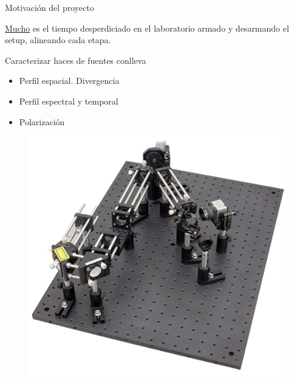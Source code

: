 \begin{frame}[t,plain]
\titlepage
\end{frame}



\begin{frame}[t]{Motivación del proyecto}


\begin{center}
\underline{Mucho} es el tiempo desperdiciado en el laboratorio armado y desarmando el setup, alineando cada etapa.
\end{center}

\begin{minipage}{0.5\textwidth}
Caracterizar haces de fuentes conlleva
\begin{itemize}
\item Perfil espacial. Divergencia
\item Perfil espectral y temporal
\item Polarización
\end{itemize}

\end{minipage}
%
\begin{minipage}{0.45\textwidth}
\begin{figure}[H]
\centering
\includegraphics[width=\textwidth]{fig/optic_setup}
\label{fig:optic_setup}
\end{figure}
\end{minipage}

\end{frame}



